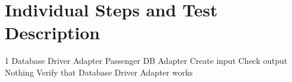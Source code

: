 \section{Individual Steps and Test Description}

\testCase
	{1}
	{Database Driver Adapter}
	{Passenger DB Adapter}
	{Create input}
	{Check output}
	{Nothing}
	{Verify that Database Driver Adapter works}